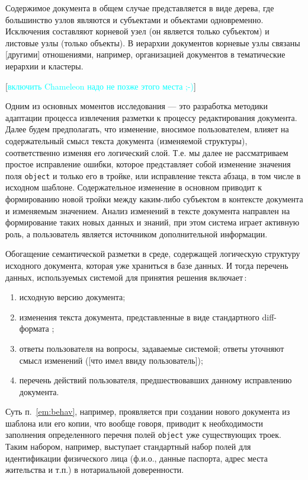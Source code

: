 \documentclass[utf8]{../IncArticle}
\newcommand{\e}[2][fcolor]{\textcolor{pcolor}{[}\textcolor{#1}{#2}\textcolor{pcolor}{]}}
\begin{document}
Содержимое документа в общем случае представляется в виде дерева, где
большинство узлов являются и субъектами и объектами
одновременно. Исключения составляют корневой узел (он является только
субъектом) и листовые узлы (только объекты).  В иерархии документов
корневые узлы связаны \e{другими} отношениями, например, организацией
документов в тематические иерархии и кластеры.

\e[cyan]{включить Chameleon надо не позже этого места ;-)}

Одним из основных моментов исследования --- это разработка методики
адаптации процесса извлечения разметки к процессу редактирования
документа.  Далее будем предполагать, что изменение, вносимое
пользователем, влияет на содержательный смысл текста документа
(изменяемой структуры), соответственно изменяя его логический слой.
Т.е. мы далее не рассматриваем простое исправление ошибки, которое
представляет собой изменение значения поля \texttt{object} и только
его в тройке, или исправление текста абзаца, в том числе в исходном
шаблоне.  Содержательное изменение в основном приводит к формированию
новой тройки между каким-либо субъектом в контексте документа и
изменяемым значением.  Анализ изменений в тексте документа направлен
на формирование таких новых данных и знаний, при этом система играет
активную роль, а пользователь является источником дополнительной
информации.

Обогащение семантической разметки в среде, содержащей логическую
структуру исходного документа, которая уже храниться в базе данных.  И
тогда перечень данных, используемых системой для принятия решения
включает\,:
\begin{enumerate}
\item исходную версию документа;
\item изменения текста документа, представленные в виде стандартного
  diff-формата \cite{b9};
\item ответы пользователя на вопросы, задаваемые системой; ответы
  уточняют смысл изменений (\e{что имел ввиду пользователь});
\item перечень действий пользователя, предшествовавших данному
  исправлению документа. \label{em:behav}
\end{enumerate}
Суть п.~\ref{em:behav}, например, проявляется при создании нового
документа из шаблона или его копии, что вообще говоря, приводит к
необходимости заполнения определенного перечня полей \texttt{object}
уже существующих троек.  Таким набором, например, выступает
стандартный набор полей для идентификации физического лица (ф.и.о.,
данные паспорта, адрес места жительства и т.п.) в нотариальной
доверенности.
\end{document}
